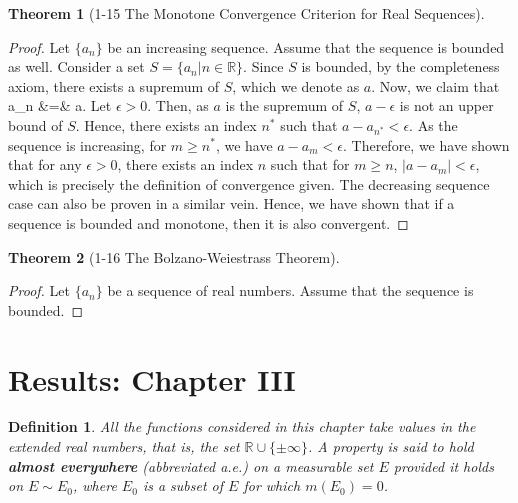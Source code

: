 \documentclass{article} %
\def\eQb#1\eQe{\begin{eqnarray*}#1\end{eqnarray*}}
\theoremstyle{quest}
\newtheorem*{definition}{Definition}
\newtheorem*{theorem}{Theorem}
\begin{document}
\begin{theorem}[1-15 The Monotone Convergence Criterion for Real Sequences]
\end{theorem}
\begin{proof}
Let $\{ a_n \}$ be an increasing sequence.
Assume that the sequence is
bounded as well. Consider a set $S = \{ a_n | n \in \mathbb{R} \}$. Since $S$ is bounded, by the 
completeness axiom, there exists a supremum of $S$, which we denote as $a$.
Now, we claim that
\eQb
\underset{n \to \infty }{\text{lim}} a_n &=& a.
\eQe
Let $\epsilon > 0$. Then, as $a$ is the supremum of $S$, $a - \epsilon$ is not an upper
bound of $S$. Hence, there exists an index $n^*$ such that $a - a_{n^*} < \epsilon$. As
the sequence is increasing, for $m \geq n^*$, we have $a - a_{m} < \epsilon$. Therefore,
we have shown that for any $\epsilon > 0$, there exists an index $n$ such that for $m \geq n$,
$|a - a_m| < \epsilon$, which is precisely the definition of convergence given. 
The decreasing sequence case can also be proven in a similar vein.
Hence, we have shown that if a sequence is bounded and monotone, then it is also convergent. 
\end{proof}

\bigskip

\begin{theorem}[1-16 The Bolzano-Weiestrass Theorem]
\end{theorem}
\begin{proof}
Let $\{ a_n \}$ be a sequence of real numbers. Assume that the sequence is bounded. 
\end{proof}


\section{Results: Chapter III}
\begin{definition}
All the functions considered in this chapter take values in the 
extended real numbers, that is, the set $\mathbb{R} \cup \{ \pm \infty \}$.
A property is said to hold \textbf{almost everywhere} (abbreviated a.e.) on
a measurable set $E$ provided it holds on $E \sim E_0$, where $E_0$ is a subset
of $E$ for which $m(E_0)= 0$.
\end{definition}

\bigskip
\end{document}
